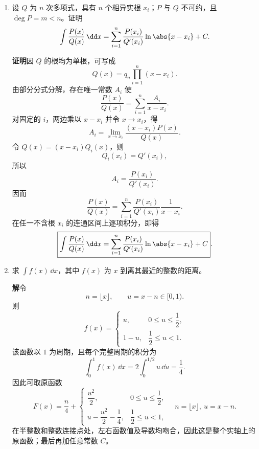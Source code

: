 \begin{enumerate}
  \textbf{证明}\quad 记
  \[
    y=\frac{\sin((x-a)/2)}{\sin((x+a)/2)}.
  \]
  在分母非零的区间上，直接求导得
  \[
    y'=\frac{\sin a}{2\sin^2((x+a)/2)}.
  \]
  另一方面，利用两角相差 $a$，可验证
  \[
    y^2-2\cos a\,y+1
    =\frac{\sin^2a}{\sin^2((x+a)/2)}.
  \]
  因此
  \begin{align*}
    y^n+y^{n-2}-2\cos a\,y^{n-1}
    &=y^{n-2}\frac{\sin^2a}{\sin^2((x+a)/2)}\\
    &=2\sin a\,y^{n-2}y'\\
    &=\frac{2\sin a}{n-1}(y^{n-1})'.
  \end{align*}
  两边积分即得
  \[
    I_n+I_{n-2}-2\cos a\,I_{n-1}
    =\frac{2\sin a}{n-1}y^{n-1},
  \]
  即
  \[
    \boxed{
    I_n=-I_{n-2}+2\cos a\,I_{n-1}
    +\frac{2\sin a}{n-1}
    \left[
      \frac{\sin((x-a)/2)}{\sin((x+a)/2)}
    \right]^{n-1}}.
  \]

  \item 设 $Q$ 为 $n$ 次多项式，具有 $n$ 个相异实根 $x_i$；$P$ 与 $Q$ 不可约，且 $\deg P=m<n$。证明
  \[
    \int\frac{P(x)}{Q(x)}\,\dd x
    =\sum_{i=1}^n\frac{P(x_i)}{Q'(x_i)}\ln\abs{x-x_i}+C.
  \]

  \textbf{证明}\quad 因 $Q$ 的根均为单根，可写成
  \[
    Q(x)=q_n\prod_{i=1}^n(x-x_i).
  \]
  由部分分式分解，存在唯一常数 $A_i$ 使
  \[
    \frac{P(x)}{Q(x)}=\sum_{i=1}^n\frac{A_i}{x-x_i}.
  \]
  对固定的 $i$，两边乘以 $x-x_i$ 并令 $x\to x_i$，得
  \[
    A_i=\lim_{x\to x_i}\frac{(x-x_i)P(x)}{Q(x)}.
  \]
  令 $Q(x)=(x-x_i)Q_i(x)$，则
  \[
    Q_i(x_i)=Q'(x_i),
  \]
  所以
  \[
    A_i=\frac{P(x_i)}{Q'(x_i)}.
  \]
  因而
  \[
    \frac{P(x)}{Q(x)}
    =\sum_{i=1}^n\frac{P(x_i)}{Q'(x_i)}\frac1{x-x_i}.
  \]
  在任一不含根 $x_i$ 的连通区间上逐项积分，即得
  \[
    \boxed{
    \int\frac{P(x)}{Q(x)}\,\dd x
    =\sum_{i=1}^n\frac{P(x_i)}{Q'(x_i)}\ln\abs{x-x_i}+C}.
  \]

  \item 求 $\int f(x)\,\dd x$，其中 $f(x)$ 为 $x$ 到离其最近的整数的距离。

  \textbf{解}\quad 令
  \[
    n=\lfloor x\rfloor,
    \qquad
    u=x-n\in[0,1).
  \]
  则
  \[
    f(x)=
    \begin{cases}
      u,&0\le u\le\dfrac12,\\[2mm]
      1-u,&\dfrac12\le u<1.
    \end{cases}
  \]
  该函数以 $1$ 为周期，且每个完整周期的积分为
  \[
    \int_0^1f(x)\,\dd x
    =2\int_0^{1/2}u\,\dd u=\frac14.
  \]
  因此可取原函数
  \[
    \boxed{
    F(x)=\frac n4+
    \begin{cases}
      \dfrac{u^2}{2},&0\le u\le\dfrac12,\\[2mm]
      u-\dfrac{u^2}{2}-\dfrac14,&\dfrac12\le u<1,
    \end{cases}
    \quad n=\lfloor x\rfloor,\ u=x-n}.
  \]
  在半整数和整数连接点处，左右函数值及导数均吻合，因此这是整个实轴上的原函数；最后再加任意常数 $C$。


\end{enumerate}
